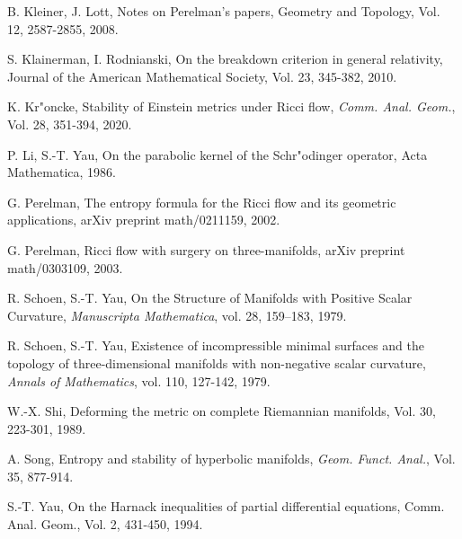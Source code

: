 \documentclass{amsart}
\begin{document}
\begin{thebibliography}{}
 B. Kleiner, J. Lott, Notes on Perelman’s papers, Geometry and Topology, Vol. 12, 2587-2855, 2008.  




 S. Klainerman, I. Rodnianski, On the breakdown criterion in general relativity, Journal of the American Mathematical Society, Vol. 23, 345-382, 2010.

 K. Kr{"o}ncke, Stability of Einstein metrics under Ricci flow, \textit{Comm. Anal. Geom.}, Vol. 28, 351-394, 2020.

 P. Li, S.-T. Yau, On the parabolic kernel of the Schr{"o}dinger operator, Acta Mathematica, 1986.

 G. Perelman, The entropy formula for the Ricci flow and its geometric applications, arXiv preprint math/0211159, 2002.

 G. Perelman, Ricci flow with surgery on three-manifolds, arXiv preprint math/0303109, 2003.

 R. Schoen, S.-T. Yau, On the Structure of Manifolds with Positive Scalar Curvature, \textit{Manuscripta Mathematica}, vol. 28, 159–183, 1979.

 R. Schoen, S.-T. Yau, Existence of incompressible minimal surfaces and the topology of three-dimensional manifolds with non-negative scalar curvature, \textit{Annals of Mathematics}, vol. 110, 127-142, 1979.

 W.-X. Shi, Deforming the metric on complete Riemannian manifolds, Vol. 30, 223-301, 1989.

 A. Song, Entropy and stability of hyperbolic manifolds, \textit{Geom. Funct. Anal.}, Vol. 35, 877-914.

 S.-T. Yau, On the Harnack inequalities of partial differential equations, Comm. Anal. Geom., Vol. 2, 431-450, 1994.








\end{thebibliography}
\end{document}
